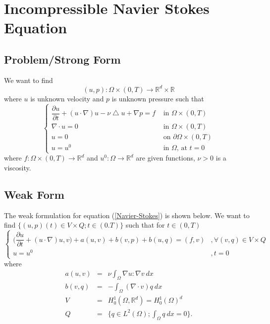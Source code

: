 \documentclass[a4paper,10pt]{article}
\newcommand{\R}{\mathbb{R}}
\begin{document}
\section{Incompressible Navier Stokes Equation}

\subsection{Problem/Strong Form}
We want to find \[(u,p) : \Omega \times (0,T) \rightarrow \R^d \times \R\] where $ u $ is unknown velocity and $ p $ is unknown pressure such that
\begin{equation}\label{Navier-Stokes}
\begin{cases}
\dfrac{\partial u}{\partial t} + (u \cdot \nabla) u - \nu \bigtriangleup u + \nabla p = f & \text{ in } \Omega \times (0,T)\\
\nabla \cdot u = 0 & \text{ in } \Omega \times (0,T)\\
u = 0 & \text{ on } \partial \Omega \times (0,T)\\
u = u^0 & \text{ in } \Omega \text{, at } t=0
\end{cases}
\end{equation}
where $ f : \Omega \times (0,T) \rightarrow \R^d $ and $ u^0 : \Omega \rightarrow \R^d $ are given functions, $ \nu > 0 $ is a viscosity.

\subsection{Weak Form}
The weak formulation for equation (\ref{Navier-Stokes}) is shown below. We want to find $ \{ (u,p)(t) \in V \times Q ; t \in (0.T) \} $ such that for $ t \in (0,T) $
\begin{equation} \label{NS_Weak}
\begin{cases}
\big( \dfrac{\partial u}{\partial t} + (u \cdot \nabla)u,v \big) + a(u,v) + b(v,p) + b(u,q) = (f,v) & ,\forall(v,q)\in V\times Q \\ u=u^{0} & , t=0
\end{cases}
\end{equation}
where
\begin{eqnarray}\nonumber
a(u,v) &=& \nu \int_{\Omega} \nabla u : \nabla v \ dx \\ \nonumber
b(v,q) &=& - \int_{\Omega} (\nabla \cdot v) q \ dx \\ \nonumber
V &=& H_{0}^{1}(\Omega, \R^d) = H_{0}^{1}(\Omega)^d \\ \nonumber
Q &=& \{ q\in L^2(\Omega) ; \int_{\Omega} q \ dx=0 \}.
\end{eqnarray}
\end{document}
